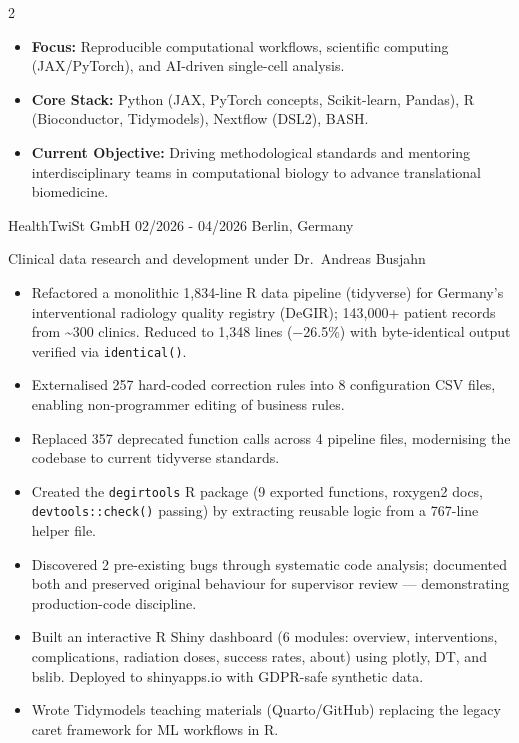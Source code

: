 \documentclass{thejus_cv}
\begin{document}
\begin{paracol}{2}


\begin{itemize}[label=\textbullet, leftmargin=1em]
    \item \textbf{Focus:} Reproducible computational workflows, scientific computing (JAX/PyTorch), and AI-driven single-cell analysis.
    \item \textbf{Core Stack:} Python (JAX, PyTorch concepts, Scikit-learn, Pandas), R (Bioconductor, Tidymodels), Nextflow (DSL2), BASH.
    \item \textbf{Current Objective:} Driving methodological standards and mentoring interdisciplinary teams in computational biology to advance translational biomedicine.
\end{itemize}


             {HealthTwiSt GmbH}
             {02/2026 - 04/2026}
             {Berlin, Germany}
             {Clinical data research and development under Dr.~Andreas Busjahn
             \begin{itemize}
                   \item Refactored a monolithic 1,834-line R data pipeline (tidyverse) for Germany's interventional radiology quality registry (DeGIR); 143,000+ patient records from \textasciitilde300 clinics. Reduced to 1,348 lines ($-$26.5\%) with byte-identical output verified via \texttt{identical()}.
                   \item Externalised 257 hard-coded correction rules into 8 configuration CSV files, enabling non-programmer editing of business rules.
                   \item Replaced 357 deprecated function calls across 4 pipeline files, modernising the codebase to current tidyverse standards.
                   \item Created the \texttt{degirtools} R package (9 exported functions, roxygen2 docs, \texttt{devtools::check()} passing) by extracting reusable logic from a 767-line helper file.
                   \item Discovered 2 pre-existing bugs through systematic code analysis; documented both and preserved original behaviour for supervisor review --- demonstrating production-code discipline.
                   \item Built an interactive R Shiny dashboard (6 modules: overview, interventions, complications, radiation doses, success rates, about) using plotly, DT, and bslib. Deployed to shinyapps.io with GDPR-safe synthetic data.
                   \item Wrote Tidymodels teaching materials (Quarto/GitHub) replacing the legacy caret framework for ML workflows in R.
               \end{itemize}}


\end{paracol}
\end{document}
